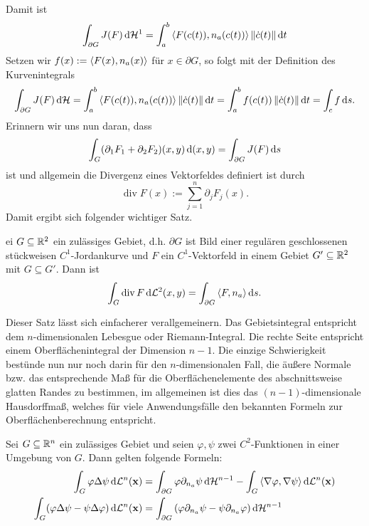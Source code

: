 \documentclass[
pdftex,
oneside,
headsepline,
11pt, 
]{scrreprt}
\begin{document}
Damit ist \[  \int_{\partial G} J(F) \mathop{}\!\mathrm{d} \mathcal{H}^1=\int_a^b \left\langle F(c(t)),n_a(c(t)) \right\rangle\left\lVert\dot{c}(t)\right\rVert\mathop{}\!\mathrm{d} t \]   
Setzen wir $f(x):=\left\langle F(x),n_a(x) \right\rangle$ für $x\in\partial G$, so folgt mit der Definition des Kurvenintegrals
\[ \int_{\partial G} J(F) \mathop{}\!\mathrm{d} \mathcal{H}= \int_a^b \left\langle F(c(t)),n_a(c(t)) \right\rangle\left\lVert\dot{c}(t)\right\rVert\mathop{}\!\mathrm{d} t =\int_a^b f(c(t))\left\lVert\dot{c}(t)\right\rVert\mathop{}\!\mathrm{d} t=\int_c f \mathop{}\!\mathrm{d} s.\] Erinnern wir uns nun daran, dass \[  \int_G (\partial_1 F_1+\partial_2F_2)(x,y)\mathop{}\!\mathrm{d} (x,y)=\int_{\partial G}J(F)\mathop{}\!\mathrm{d} s \] ist und allgemein die Divergenz eines Vektorfeldes definiert ist durch \[ \operatorname{div} F(x):=\sum_{j=1}^n \partial_jF_j(x).\] Damit ergibt sich folgender wichtiger Satz.
\begin{theo}
	ei $G\subseteq \mathbb{R}^2$ ein zulässiges Gebiet, d.h. $\partial G$ ist Bild einer regulären geschlossenen stückweisen $C^1$-Jordankurve und $F$ ein $C^1$-Vektorfeld in einem Gebiet $G'\subseteq \mathbb{R}^2$ mit $G\subseteq G'$. Dann ist \[  \int_G \operatorname{div} F \mathop{}\!\mathrm{d} \mathcal{L}^2(x,y)=\int_{\partial G} \left\langle F,n_a \right\rangle \mathop{}\!\mathrm{d} s. \]
\end{theo}
Dieser Satz lässt sich einfacherer verallgemeinern. Das Gebietsintegral entspricht dem $n$-dimensionalen Lebesgue oder  Riemann-Integral. Die rechte Seite entspricht einem Oberflächenintegral der Dimension $n-1$. Die einzige Schwierigkeit bestünde nun nur noch darin für den $n$-dimensionalen Fall, die äußere Normale bzw. das entsprechende Maß für die Oberflächenelemente des abschnittsweise glatten Randes zu bestimmen, im allgemeinen ist dies das $(n-1)$-dimensionale Hausdorffmaß, welches für viele Anwendungsfälle den bekannten Formeln zur Oberflächenberechnung entspricht. 
\begin{theo} Sei $G\subseteq \mathbb{R}^n$ ein zulässiges Gebiet und seien $\varphi,\psi$ zwei $C^2$-Funktionen in einer Umgebung von $G$. Dann gelten folgende Formeln: 
	\begin{align*}
	\int_G \varphi \Delta \psi \mathop{}\!\mathrm{d} \mathcal{L}^n(\textnormal{\textbf{x}})&=\int_{\partial G}\varphi \partial_{n_a}\psi \mathop{}\!\mathrm{d} \mathcal{H}^{n-1}-\int_G\left\langle \nabla \varphi,\nabla \psi \right\rangle\mathop{}\!\mathrm{d} \mathcal{L}^n(\textnormal{\textbf{x}})\\
	\int_G (\varphi \Delta \psi-\psi\Delta\varphi) \mathop{}\!\mathrm{d} \mathcal{L}^n(\textnormal{\textbf{x}})&=\int_{\partial G}\left(  \varphi\partial_{n_a}\psi-\psi\partial_{n_a}\varphi \right)\mathop{}\!\mathrm{d} \mathcal{H}^{n-1}
	\end{align*}
	
\end{theo}
\end{document}
